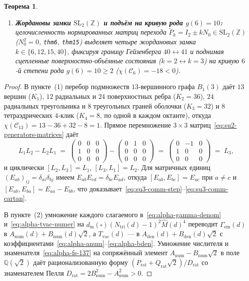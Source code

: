 \documentclass[11pt,a4paper]{article}
\theoremstyle{plain}
\newtheorem{theorem}{Теорема}[section]
\theoremstyle{definition}
\begin{document}
\begin{theorem}
\begin{enumerate}[label=\textbf{(\arabic*)},leftmargin=*]
\item \textbf{Жордановы замки $\mathrm{SL}_2(\mathbb{Z})$ и подъём на кривую рода $g(6) = 10$:}
  целочисленность нормированных матриц перехода $\widetilde{P}_k = I_2 \pm k N_0 \in \mathrm{SL}_2(\mathbb{Z})$ ($N_0^2 = 0$, \texttt{thm6}, \texttt{thm15}) выделяет четыре жордановых замка $k \in \{6, 12, 15, 40\}$, фиксируя границу Гейзенберга $40 \leftrightarrow 41$ и поднимая сцепленные поверхностно-объёмные состояния ($k = 2 \leftrightarrow k = 3$) на кривую $6$-й степени рода $g(6) = 10 \ge 2$ ($\chi(\mathcal{C}_6) = -18 < 0$).
\end{enumerate}
\end{theorem}

\begin{proof}
В пункте~(1) перебор подмножеств $13$-вершинного графа $B_1(3)$ даёт $13$ вершин ($K_1$), $12$ радиальных и $24$ поверхностных ребра ($K_2 = 36$), $24$ радиальных треугольника и $8$ треугольных граней оболочки ($K_3 = 32$) и $8$ тетраэдрических $4$-клик ($K_4 = 8$, по одной в каждом октанте), откуда $\chi(\mathcal{C}_{13}) = 13 - 36 + 32 - 8 = 1$. Прямое перемножение $3\times 3$ матриц~\eqref{eq:su2-generators-matrices} даёт
\begin{equation*}
  L_1 L_2 - L_2 L_1 \;=\; \begin{pmatrix} 0 & 0 & 0 \\ 1 & 0 & 0 \\ 0 & 0 & 0 \end{pmatrix} - \begin{pmatrix} 0 & 1 & 0 \\ 0 & 0 & 0 \\ 0 & 0 & 0 \end{pmatrix} \;=\; \begin{pmatrix} 0 & -1 & 0 \\ 1 & 0 & 0 \\ 0 & 0 & 0 \end{pmatrix} \;=\; L_3,
\end{equation*}
и циклически $[L_2, L_3] = L_1$, $[L_3, L_1] = L_2$. Для матричных единиц $(E_{ab})_{ij} = \delta_{ai}\delta_{bj}$ имеем $E_{ab} E_{cd} = \delta_{bc} E_{ad}$, откуда $[E_{ab}, E_{bc}] = E_{ac}$ при $a \ne c$ и $[E_{ab}, E_{ba}] = E_{aa} - E_{bb}$, что доказывает~\eqref{eq:su3-comm-step}--\eqref{eq:su3-comm-cartan}.

В пункте~(2) умножение каждого слагаемого в~\eqref{eq:alpha-gamma-denom} и~\eqref{eq:alpha-tvac-numer} на $d_{\mathrm{in}}(\square)(N_{\mathrm{tri}}(d)-1)^2\widehat{M}(d)^4$ переводит $\Gamma_{\mathrm{em}}(d)$ в $A_{\mathrm{num}}(d) + B_{\mathrm{num}}(d)\sqrt{2}$, а $T_{\mathrm{vac}}(d)$ --- в $A_{\mathrm{den}}(d) + B_{\mathrm{den}}(d)\sqrt{2}$ с коэффициентами~\eqref{eq:alpha-anum}--\eqref{eq:alpha-bden}. Умножение числителя и знаменателя~\eqref{eq:alpha-fs-137} на сопряжённый элемент $A_{\mathrm{num}} - B_{\mathrm{num}}\sqrt{2}$ в поле $\mathbb{Q}(\sqrt{2})$ даёт рационализованную форму $(P_{\mathrm{rat}} + Q_{\mathrm{rat}}\sqrt{2})/D_{\mathrm{rat}}$ со знаменателем Пелля $D_{\mathrm{rat}} = 2 B_{\mathrm{num}}^2 - A_{\mathrm{num}}^2 > 0$.
\end{proof}
\end{document}
